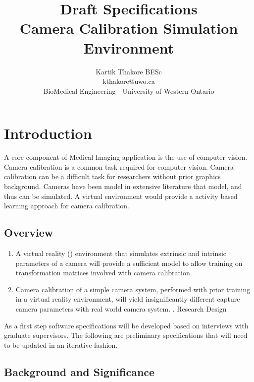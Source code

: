 \documentclass[11pt]{report}
\title{Draft Specifications\\Camera Calibration Simulation Environment}
\author{Kartik Thakore BESc\\
		kthakore@uwo.ca\\
		BioMedical Engineering - University of Western Ontario}
\date{}
\begin{document}

\nocite{*}

\maketitle

\tableofcontents

\newpage 

\chapter{Introduction}
  
A core component of Medical Imaging application is the use of computer vision. Camera calibration is a common task required for computer vision. Camera calibration can be a difficult task for researchers without prior graphics background. Cameras have been model in extensive literature that model, and thus can be simulated. A virtual environment would provide a activity based learning approach for camera calibration. 
     
\section{Overview}


     
\begin{enumerate}
\item A virtual reality () environment that simulates extrinsic and intrinsic parameters of a camera will provide a sufficient model to allow training on transformation matrices involved with camera calibration.
\item Camera calibration of a simple camera system, performed with prior training in a virtual reality environment, will yield insignificantly different capture camera parameters with real world camera system. 
. Research Design
\end{enumerate}

As a first step software specifications will be developed based on interviews with graduate supervisors. The following are preliminary specifications that will need to be updated in an iterative fashion. 

\section{Background and Significance}
\end{document}
